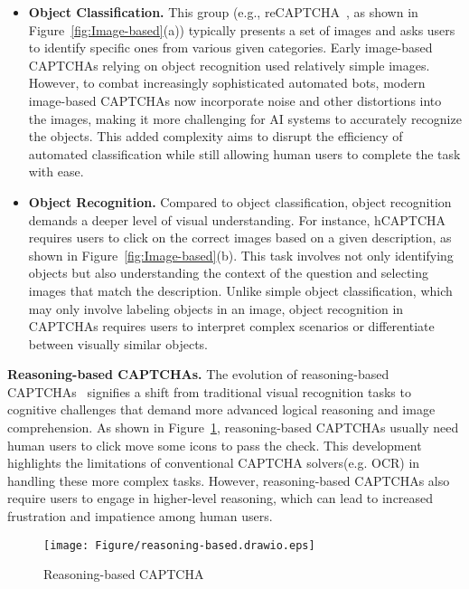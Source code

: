 \begin{itemize}[leftmargin=*]

\item \textbf{Object Classification. }
This group (e.g., reCAPTCHA~\cite{reCaptcha}, as shown in Figure~\ref{fig:Image-based}(a)) typically presents a set of images and asks users to identify specific ones from various given categories. Early image-based CAPTCHAs relying on object recognition used relatively simple images. However, to combat increasingly sophisticated automated bots, modern image-based CAPTCHAs now incorporate noise and other distortions into the images, making it more challenging for AI systems to accurately recognize the objects. This added complexity aims to disrupt the efficiency of automated classification while still allowing human users to complete the task with ease.
    
\item \textbf{Object Recognition.} Compared to object classification, object recognition demands a deeper level of visual understanding. For instance, hCAPTCHA~\cite{hCaptcha} requires users to click on the correct images based on a given description, as shown in Figure~\ref{fig:Image-based}(b). This task involves not only identifying objects but also understanding the context of the question and selecting images that match the description. Unlike simple object classification, which may only involve labeling objects in an image, object recognition in CAPTCHAs requires users to interpret complex scenarios or differentiate between visually similar objects.
    
\end{itemize}
\noindent\textbf{Reasoning-based CAPTCHAs.}
The evolution of reasoning-based CAPTCHAs~\cite{wang2018captcha} signifies a shift from traditional visual recognition tasks to cognitive challenges that demand more advanced logical reasoning and image comprehension. As shown in Figure~\ref{fig:Reasoning-based}, reasoning-based CAPTCHAs usually need human users to click move some icons to pass the check. This development highlights the limitations of conventional CAPTCHA solvers(e.g. OCR) in handling these more complex tasks. However, reasoning-based CAPTCHAs also require users to engage in higher-level reasoning, which can lead to increased frustration and impatience among human users.

\begin{figure}[t!]
	\centering
    \texttt{[image: Figure/reasoning-based.drawio.eps]}
	\caption{Reasoning-based CAPTCHA}
	\label{fig:Reasoning-based}
\end{figure}

